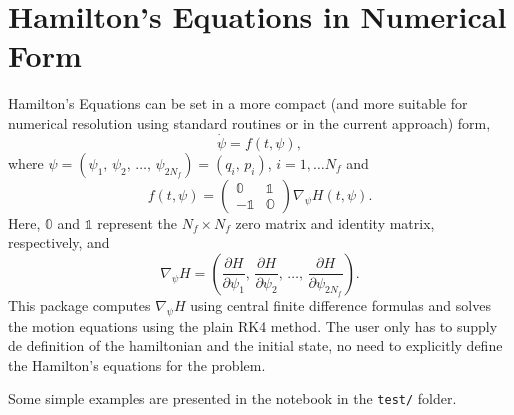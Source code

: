 \documentclass{article}
\newcommand{\pd}[2]{\frac{\partial#1}{\partial#2}}
\begin{document}
\section{Hamilton's Equations in Numerical Form}
Hamilton's Equations can be set in a more compact (and more suitable for
numerical resolution using standard routines or in the current approach) form,
\begin{equation}\label{eq:HEterse}
  \dot \psi=f(t,\psi),
\end{equation}
where $\psi=(\psi_1,\,\psi_2,\,\ldots,\,\psi_{2N_f})=(q_i,\,p_i)$,
$i=1,\ldots N_f$ and
\begin{equation}
  f(t,\psi)=
  \begin{pmatrix}
    \mathbb{0}&\mathbb{1}\\
    -\mathbb{1} &\mathbb{O}
  \end{pmatrix}\nabla_\psi H(t,\psi).
\end{equation}
Here, $\mathbb{0}$ and $\mathbb{1}$ represent the $N_f\times N_f$ zero matrix
and identity matrix, respectively, and
\begin{equation*}
  \nabla_\psi H=\left(
    \pd{H}{\psi_1},\,
    \pd{H}{\psi_2},\,\ldots,\,
    \pd{H}{\psi_{2N_f}}
    \right).
\end{equation*}
This package computes $\nabla_\psi H$ using central finite difference formulas
and solves the motion equations using the plain RK4 method. The user only has to
supply de definition of the hamiltonian and the initial state, no need to
explicitly define the Hamilton's equations for the problem.

Some simple examples are presented in the notebook in the \texttt{test/} folder.
\end{document}
